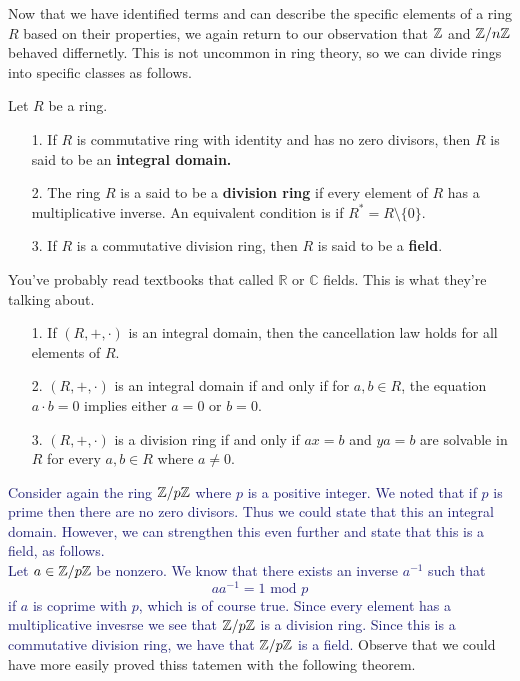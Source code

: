     \textcolor{NavyBlue}{Now that we have identified terms and can
    describe the specific elements of a ring $R$ based on their
    properties, we again return to our observation that $\mathbb{Z}$ and
    $\mathbb{Z}/n\mathbb{Z}$ behaved differnetly. This is not uncommon in ring
    theory, so we can divide rings into specific classes as
    follows.}
    
    \begin{definition}
        Let $R$ be a ring. 
        \begin{itemize}
            \item[1.] If $R$ is commutative ring with identity and has
            no zero divisors, then $R$ is said to be an
            \textbf{integral domain.}
            \item[2.] The ring $R$ is a said to be a \textbf{division ring}
            if every element of $R$ has a multiplicative inverse.
            An equivalent condition is if $R^* = R\setminus
            \{0\}$.
            \item[3.] If $R$ is a commutative division ring, then
            $R$ is said to be a \textbf{field}.
        \end{itemize}
    \end{definition}

    You've probably read textbooks that called $\mathbb{R}$ or
    $\mathbb{C}$ fields. This is what they're talking about. 

    \begin{proposition}
        \begin{itemize}
            \item[1.] If $(R, +, \cdot)$ is an integral domain, then the
            cancellation law holds for all elements of $R$. 

            \item[2.] $(R, +, \cdot)$ is an integral domain if and
            only if for $a, b \in R$, the equation $a\cdot b = 0$
            implies either $a = 0$ or $b = 0$. 

            \item[3.] $(R, +, \cdot)$ is a division ring if and only if $ax =
            b$ and $ya = b$ are solvable in $R$ for every $a, b \in R$
            where $a \ne 0 $.
        \end{itemize}
    \end{proposition}

    \textcolor{MidnightBlue}{Consider again the ring $\mathbb{Z}/p\mathbb{Z}$
    where $p$ is a positive integer. We noted that if $p$ is
    prime then there are no zero divisors. Thus we could state
    that this an integral domain. However, we can strengthen
    this even further and state that this is a field, as follows.
    \\
    \indent Let $a \in \mathbb{Z}/p\mathbb{Z}$ be nonzero. We know that there exists an
    inverse $a^{-1}$ such that 
    \[ 
        aa^{-1} = 1 \mbox{ mod } p 
    \] 
    if $a$ is coprime with $p$, which is of course true. Since
    every element has a multiplicative invesrse we see that
    $\mathbb{Z}/p\mathbb{Z}$ is a division ring. Since this is a commutative
    division ring, we have that $\mathbb{Z}/p\mathbb{Z}$ is a field.
    }
    Observe that we could have more easily proved thiss tatemen
    with the following theorem.
    
